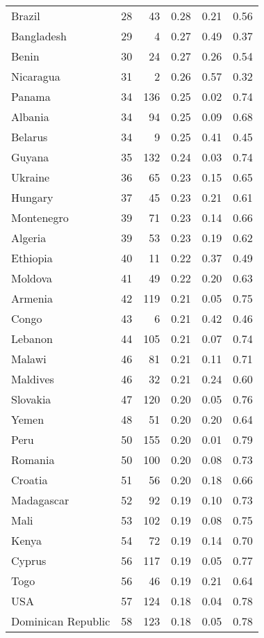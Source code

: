 \begin{longtable}[t]{lrrrrr}
Brazil & 28 & 43 & 0.28 & 0.21 & 0.56\\
Bangladesh & 29 & 4 & 0.27 & 0.49 & 0.37\\
Benin & 30 & 24 & 0.27 & 0.26 & 0.54\\
\addlinespace
Nicaragua & 31 & 2 & 0.26 & 0.57 & 0.32\\
Panama & 34 & 136 & 0.25 & 0.02 & 0.74\\
Albania & 34 & 94 & 0.25 & 0.09 & 0.68\\
Belarus & 34 & 9 & 0.25 & 0.41 & 0.45\\
Guyana & 35 & 132 & 0.24 & 0.03 & 0.74\\
\addlinespace
Ukraine & 36 & 65 & 0.23 & 0.15 & 0.65\\
Hungary & 37 & 45 & 0.23 & 0.21 & 0.61\\
Montenegro & 39 & 71 & 0.23 & 0.14 & 0.66\\
Algeria & 39 & 53 & 0.23 & 0.19 & 0.62\\
Ethiopia & 40 & 11 & 0.22 & 0.37 & 0.49\\
\addlinespace
Moldova & 41 & 49 & 0.22 & 0.20 & 0.63\\
Armenia & 42 & 119 & 0.21 & 0.05 & 0.75\\
Congo & 43 & 6 & 0.21 & 0.42 & 0.46\\
Lebanon & 44 & 105 & 0.21 & 0.07 & 0.74\\
Malawi & 46 & 81 & 0.21 & 0.11 & 0.71\\
\addlinespace
Maldives & 46 & 32 & 0.21 & 0.24 & 0.60\\
Slovakia & 47 & 120 & 0.20 & 0.05 & 0.76\\
Yemen & 48 & 51 & 0.20 & 0.20 & 0.64\\
Peru & 50 & 155 & 0.20 & 0.01 & 0.79\\
Romania & 50 & 100 & 0.20 & 0.08 & 0.73\\
\addlinespace
Croatia & 51 & 56 & 0.20 & 0.18 & 0.66\\
Madagascar & 52 & 92 & 0.19 & 0.10 & 0.73\\
Mali & 53 & 102 & 0.19 & 0.08 & 0.75\\
Kenya & 54 & 72 & 0.19 & 0.14 & 0.70\\
Cyprus & 56 & 117 & 0.19 & 0.05 & 0.77\\
\addlinespace
Togo & 56 & 46 & 0.19 & 0.21 & 0.64\\
USA & 57 & 124 & 0.18 & 0.04 & 0.78\\
Dominican Republic & 58 & 123 & 0.18 & 0.05 & 0.78\\

\end{longtable}

